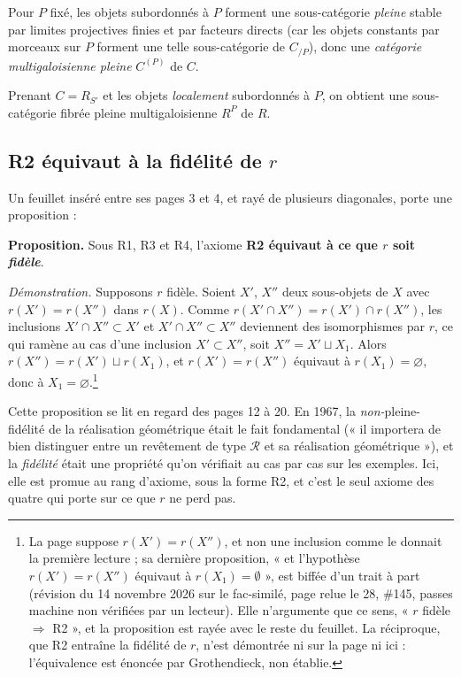 \documentclass[11pt,a4paper]{article}
\begin{document}
Pour $P$ fixé, les objets subordonnés à $P$ forment une sous-catégorie
\emph{pleine} stable par limites projectives finies et par facteurs directs
(car les objets constants par morceaux sur $P$ forment une telle sous-catégorie
de $C_{/P}$), donc une \emph{catégorie multigaloisienne pleine} $C^{(P)}$
de $C$.

Prenant $C = R_{S'}$ et les objets \emph{localement} subordonnés à $P$, on
obtient une sous-catégorie fibrée pleine multigaloisienne $R^{P}$ de $R$.

\subsection*{R2 équivaut à la fidélité de $r$}

Un feuillet inséré entre ses pages 3 et 4, et rayé de plusieurs diagonales,
porte une proposition :

\textbf{Proposition.} Sous R1, R3 et R4, l'axiome \textbf{R2 équivaut à ce que
$r$ soit \emph{fidèle}}.

\emph{Démonstration.} Supposons $r$ fidèle. Soient $X'$, $X''$ deux sous-objets
de $X$ avec $r(X') = r(X'')$ dans $r(X)$. Comme
$r(X' \cap X'') = r(X') \cap r(X'')$, les inclusions
$X' \cap X'' \subset X'$ et $X' \cap X'' \subset X''$ deviennent des
isomorphismes par $r$, ce qui ramène au cas d'une inclusion
$X' \subset X''$, soit $X'' = X' \sqcup X_{1}$. Alors
$r(X'') = r(X') \sqcup r(X_{1})$, et $r(X') = r(X'')$ équivaut à
$r(X_{1}) = \varnothing$, donc à $X_{1} = \varnothing$.\footnote{La page
suppose $r(X') = r(X'')$, et non une inclusion comme le donnait la première
lecture ; sa dernière proposition, « et l'hypothèse $r(X') = r(X'')$ équivaut
à $r(X_{1}) = \emptyset$ », est biffée d'un trait à part (révision du 14
novembre 2026 sur le fac-similé, page relue le 28, \#145, passes machine non
vérifiées par un lecteur). Elle n'argumente que ce sens, « $r$ fidèle $\Rightarrow$ R2 », et la proposition
est rayée avec le reste du feuillet. La réciproque, que R2 entraîne la
fidélité de $r$, n'est démontrée ni sur la page ni ici : l'équivalence est
énoncée par Grothendieck, non établie.}

Cette proposition se lit en regard des pages 12 à 20. En 1967, la
\emph{non-}pleine-fidélité de la réalisation géométrique était le fait
fondamental (« il importera de bien distinguer entre un revêtement de type
$\mathcal{R}$ et sa réalisation géométrique »), et la \emph{fidélité} était
une propriété qu'on vérifiait au cas par cas sur les exemples. Ici, elle est
promue au rang d'axiome, sous la forme R2, et c'est le seul axiome des quatre
qui porte sur ce que $r$ ne perd pas.
\end{document}
